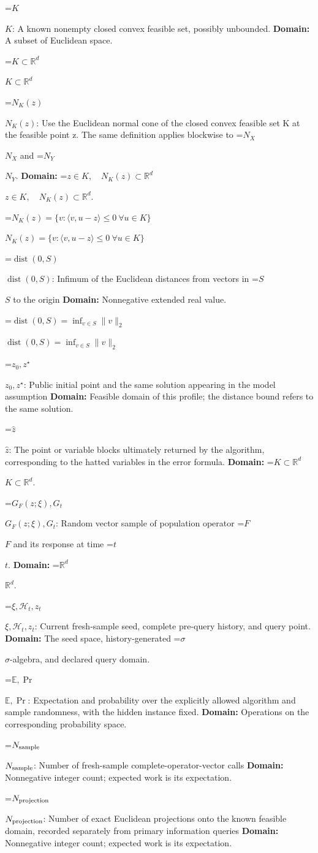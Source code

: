 \documentclass[10pt,a4paper]{article}
\newcommand{\AtlasMath}[1]{\par\begingroup\centering\setbox0=\hbox{$\displaystyle #1$}\ifdim\wd0>1.4\linewidth\typeout{ATLAS WIDE FORMULA: \the\wd0}\fi\ifdim\wd0>\linewidth\resizebox{\linewidth}{!}{\box0}\else\box0\fi\par\endgroup}
\newcommand{\AtlasInlineMath}[1]{\begingroup\setbox0=\hbox{$#1$}\ifdim\wd0>.4\linewidth\endgroup\AtlasMath{#1}\else\endgroup$#1$\fi}
\begin{document}
\AtlasInlineMath{K}: A known nonempty closed convex feasible set, possibly unbounded. \textbf{Domain:} A subset of Euclidean space.

\AtlasInlineMath{K\subset\mathbb R^d}

\AtlasInlineMath{N_K(z)}: Use the Euclidean normal cone of the closed convex feasible set K at the feasible point z. The same definition applies blockwise to \AtlasInlineMath{N_X} and \AtlasInlineMath{N_Y}. \textbf{Domain:} \AtlasInlineMath{z\in K,\quad N_K(z)\subset\mathbb R^d}.

\AtlasInlineMath{N_K(z)=\{v:\langle v,u-z\rangle\le0\ \forall u\in K\}}

\AtlasInlineMath{\operatorname{dist}(0,S)}: Infimum of the Euclidean distances from vectors in \AtlasInlineMath{S} to the origin \textbf{Domain:} Nonnegative extended real value.

\AtlasInlineMath{\operatorname{dist}(0,S)=\inf_{v\in S}\|v\|_2}

\AtlasInlineMath{z_0,z^\star}: Public initial point and the same solution appearing in the model assumption \textbf{Domain:} Feasible domain of this profile; the distance bound refers to the same solution.

\AtlasInlineMath{\widehat z}: The point or variable blocks ultimately returned by the algorithm, corresponding to the hatted variables in the error formula. \textbf{Domain:} \AtlasInlineMath{K\subset\mathbb R^d}.

\AtlasInlineMath{G_F(z;\xi),G_t}: Random vector sample of population operator \AtlasInlineMath{F} and its response at time \AtlasInlineMath{t}. \textbf{Domain:} \AtlasInlineMath{\mathbb R^d}.

\AtlasInlineMath{\xi,\mathcal H_t,z_t}: Current fresh-sample seed, complete pre-query history, and query point. \textbf{Domain:} The seed space, history-generated \AtlasInlineMath{\sigma}-algebra, and declared query domain.

\AtlasInlineMath{\mathbb E,\Pr}: Expectation and probability over the explicitly allowed algorithm and sample randomness, with the hidden instance fixed. \textbf{Domain:} Operations on the corresponding probability space.

\AtlasInlineMath{N_{\rm sample}}: Number of fresh-sample complete-operator-vector calls \textbf{Domain:} Nonnegative integer count; expected work is its expectation.

\AtlasInlineMath{N_{\rm projection}}: Number of exact Euclidean projections onto the known feasible domain, recorded separately from primary information queries \textbf{Domain:} Nonnegative integer count; expected work is its expectation.
\end{document}
